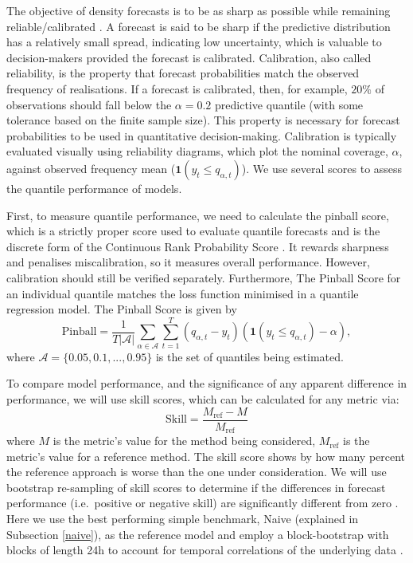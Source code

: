 \documentclass[]{elsarticle} %
\begin{document}
The objective of density forecasts is to be as sharp as possible while
remaining reliable/calibrated \citep{gneiting2007probabilistic}. A forecast
is said to be sharp if the predictive distribution has a relatively
small spread, indicating low uncertainty, which is valuable to
decision-makers provided the forecast is calibrated. Calibration, also
called reliability, is the property that forecast probabilities match
the observed frequency of realisations. If a forecast is calibrated,
then, for example, \(20\%\) of observations should fall below the
\(\alpha=0.2\) predictive quantile (with some tolerance based on the
finite sample size). This property is necessary for forecast
probabilities to be used in quantitative decision-making. Calibration is
typically evaluated visually using reliability diagrams, which plot the
nominal coverage, \(\alpha\), against observed frequency mean
(\(\mathbf{1}(y_{t}\leq q_{\alpha,t})\)). We use several scores to assess
the quantile performance of models.

First, to measure quantile performance, we need to calculate the pinball
score, which is a strictly proper score used to evaluate quantile
forecasts and is the discrete form of the Continuous Rank Probability
Score \citep{hyndman2021forecasting}. It rewards sharpness and penalises
miscalibration, so it measures overall performance. However, calibration
should still be verified separately. Furthermore, The Pinball Score for
an individual quantile matches the loss function minimised in a quantile
regression model. The Pinball Score is given by \begin{equation}
    \text{Pinball} = 
    \frac{1}{T|\mathcal{A}|} \sum_{\alpha \in \mathcal{A}} \sum_{t=1}^T
 \left(q_{\alpha,t} - y_{t} \right)
 \left(\mathbf{1}(y_{t}\leq q_{\alpha,t})-\alpha \right) ,
 \label{eq:pinball}
\end{equation} where \(\mathcal{A} = \{0.05,0.1,...,0.95\}\) is the set of
quantiles being estimated.

To compare model performance, and the significance of any apparent
difference in performance, we will use skill scores, which can be
calculated for any metric via: \begin{equation}
  \mathrm{Skill} = \frac{M_\mathrm{ref} - M}{M_\mathrm{ref}} \label{eq:skillscore}
\end{equation} where \(M\) is the metric's value for the method being
considered, \(M_\mathrm{ref}\) is the metric's value for a reference
method. The skill score shows by how many percent the reference
approach is worse than the one under consideration. We will use
bootstrap re-sampling of skill scores to determine if the differences in
forecast performance (i.e.~positive or negative skill) are significantly
different from zero \citep{Efron1981Bootstrap}. Here we use the best
performing simple benchmark, Naive (explained in Subsection
\ref{naive}), as the reference model and employ a block-bootstrap
with blocks of length 24h to account for temporal correlations of the
underlying data \citep{hongyi1996bootstrapping, Bergmeir2016303}.
\end{document}
